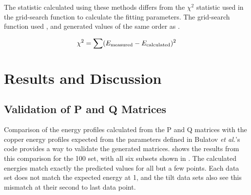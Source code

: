 \documentclass[twoside,senior]{BYUPhys}
\begin{document}
The statistic calculated using these methods differs from the $\chi^2$ statistic used in the grid-search function to calculate the fitting parameters.  The grid-search function used , and generated values of the same order as .

\begin{equation}
\label{eq:chi2grid}
\chi^2=\sum (E_{\textnormal{measured}} - E_{\textnormal{calculated}})^2
\end{equation}

\chapter{Results and Discussion\label{results}}
\section{Validation of P and Q Matrices\label{results:PQValid}}
Comparison of the energy profiles calculated from the P and Q matrices with the copper energy profiles expected from the parameters defined in Bulatov \emph{et al.}'s code provides a way to validate the generated matrices.   shows the results from this comparison for the \textlangle{}100\textrangle{} set, with all six subsets shown in .  The calculated energies match exactly the predicted values for all but a few points.  Each data set does not match the expected energy at 1\textdegree{}, and the tilt data sets also see this mismatch at their second to last data point.
\end{document}
